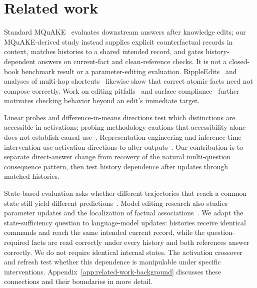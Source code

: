 \documentclass{article}
\begin{document}
\section{Related work}
\label{sec:related-work}
Standard MQuAKE~\citep{zhong2023mquake} evaluates downstream answers after knowledge edits; our MQuAKE-derived study instead supplies explicit counterfactual records in context, matches histories to a shared intended record, and gates history-dependent answers on current-fact and clean-reference checks. It is not a closed-book benchmark result or a parameter-editing evaluation. RippleEdits~\citep{cohen2024ripple} and analyses of multi-hop shortcuts~\citep{ju2024shortcuts} likewise show that correct atomic facts need not compose correctly. Work on editing pitfalls~\citep{li2024pitfalls} and surface compliance~\citep{gu2026surface} further motivates checking behavior beyond an edit's immediate target.

Linear probes and difference-in-means directions test which distinctions are accessible in activations; probing methodology cautions that accessibility alone does not establish causal use~\citep{burns2023discovering,elazar2021amnesic}. Representation engineering and inference-time intervention use activation directions to alter outputs~\citep{li2023inference,turner2023activation,zou2023representation}. Our contribution is to separate direct-answer change from recovery of the natural multi-question consequence pattern, then test history dependence after updates through matched histories.

State-based evaluation asks whether different trajectories that reach a common state still yield different predictions~\citep{vafa2024worldmodel}. Model editing research also studies parameter updates and the localization of factual associations~\citep{mitchell2022mend,meng2022rome,meng2023memit}. We adapt the state-sufficiency question to language-model updates: histories receive identical commands and reach the same intended current record, while the question-required facts are read correctly under every history and both references answer correctly. We do not require identical internal states. The activation crossover and refresh test whether this dependence is manipulable under specific interventions. Appendix~\ref{app:related-work-background} discusses these connections and their boundaries in more detail.
\end{document}
